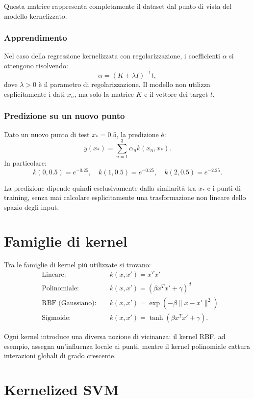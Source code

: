 \documentclass[a4paper,12pt]{report}
\begin{document}
Questa matrice rappresenta completamente il dataset dal punto di vista del modello kernelizzato.

\subsubsection*{Apprendimento}

Nel caso della regressione kernelizzata con regolarizzazione, i coefficienti $\alpha$ si ottengono risolvendo:
\[
\alpha = (K + \lambda I)^{-1} t,
\]
dove $\lambda > 0$ è il parametro di regolarizzazione. Il modello non utilizza esplicitamente i dati $x_n$, ma solo la matrice $K$ e il vettore dei target $t$.

\subsubsection*{Predizione su un nuovo punto}

Dato un nuovo punto di test $x_* = 0.5$, la predizione è:
\[
y(x_*) = \sum_{n=1}^{3} \alpha_n k(x_n,x_*).
\]
In particolare:
\[
k(0,0.5)=e^{-0.25}, \quad
k(1,0.5)=e^{-0.25}, \quad
k(2,0.5)=e^{-2.25}.
\]

La predizione dipende quindi esclusivamente dalla similarità tra $x_*$ e i punti di training, senza mai calcolare esplicitamente una trasformazione non lineare dello spazio degli input.

\section{Famiglie di kernel}

Tra le famiglie di kernel più utilizzate si trovano:
\[
\begin{aligned}
&\text{Lineare: } && k(x,x') = x^T x' \\
&\text{Polinomiale: } && k(x,x') = (\beta x^T x' + \gamma)^d \\
&\text{RBF (Gaussiano): } && k(x,x') = \exp(-\beta \|x-x'\|^2) \\
&\text{Sigmoide: } && k(x,x') = \tanh(\beta x^T x' + \gamma).
\end{aligned}
\]

Ogni kernel introduce una diversa nozione di vicinanza: il kernel RBF, ad esempio, assegna un’influenza locale ai punti, mentre il kernel polinomiale cattura interazioni globali di grado crescente.

\section{Kernelized SVM}
\end{document}
